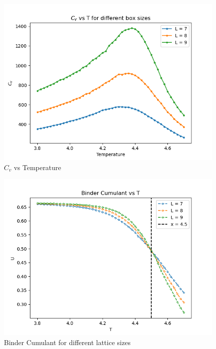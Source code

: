 \documentclass[11 pt]{article}
\begin{document}
\begin{figure}
\begin{center}
\includegraphics[width=3.0 in]{"../figures/Q7_cv_T.png"}
\caption{$C_v$ vs Temperature}
\label{cv}
\end{center}
\end{figure}
\break
\begin{figure}[!ht]
\begin{center}
\includegraphics[width=4.0 in]{"../figures/Q11_binder_cumulant.png"}
\caption{Binder Cumulant for different lattice sizes}
\label{binders}
\end{center}
\end{figure}
\end{document}
